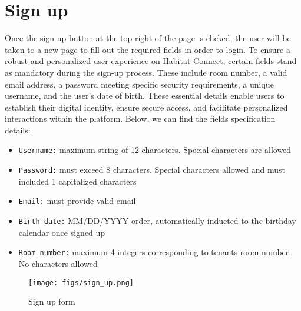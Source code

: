 \documentclass[conference]{IEEEtran}
\begin{document}
\section*{Sign up}
Once the sign up  button at the top right of the page is clicked, the user will be taken to a new page to fill out the required fields in order to login. To ensure a robust and personalized user experience on Habitat Connect, certain fields stand as mandatory during the sign-up process. These include room number, a valid email address, a password meeting specific security requirements, a unique username, and the user's date of birth. These essential details enable users to establish their digital identity, ensure secure access, and facilitate personalized interactions within the platform. Below, we can find the fields specification details:
\begin{itemize}
    \item \texttt{Username:} maximum string of 12 characters. Special characters are allowed
    \item \texttt{Password:} must exceed 8 characters. Special characters allowed and must included 1 capitalized characters
    \item \texttt{Email:} must provide valid email
    \item \texttt{Birth date:} MM/DD/YYYY order, automatically inducted to the birthday calendar once signed up
    \item \texttt{Room number:} maximum 4 integers corresponding to tenants room number. No characters allowed
\end{itemize}
\begin{figure}[H]
\centering
\texttt{[image: figs/sign\_up.png]}
\caption{Sign up form}
\label{fig:Sign up form}
\end{figure}
\end{document}
